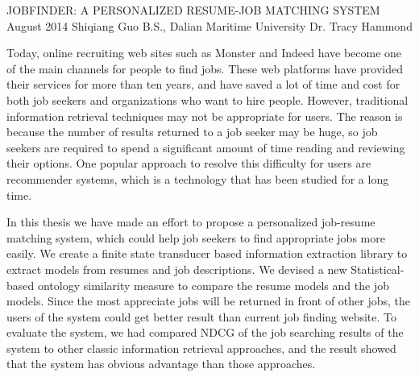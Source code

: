 \begingroup
\absone
{JOBFINDER: A PERSONALIZED RESUME-JOB MATCHING SYSTEM}
{August 2014}
{Shiqiang Guo}
{B.S., Dalian Maritime University}  %
{Dr. Tracy Hammond}%
{
Today, online recruiting web sites such as Monster and Indeed have become one of the main channels for people to find jobs. These web platforms have provided their services for more than ten years, and have saved a lot of time and cost for both job seekers and organizations who want to hire people. However, traditional information retrieval techniques may not be appropriate for users. The reason is because the number of results returned to a job seeker may be huge, so job seekers are required to spend a significant amount of time reading and reviewing their options. One popular approach to resolve this difficulty for users are recommender systems, which is a technology that has been studied for a long time.

In this thesis we have made an effort to propose a personalized job-resume matching system, which could help job seekers to find appropriate jobs more easily.  We create a finite state transducer based information extraction library to extract models from resumes and job descriptions. We devised a new Statistical-based ontology similarity measure to compare the resume models and the job models. Since the most appreciate jobs will be returned in front of other jobs, the users of the system could get better result than current job finding website. To evaluate the system, we had compared NDCG of the job searching results of the system to other classic information retrieval approaches, and the result showed that the system has obvious advantage than those approaches.

}
\endgroup



